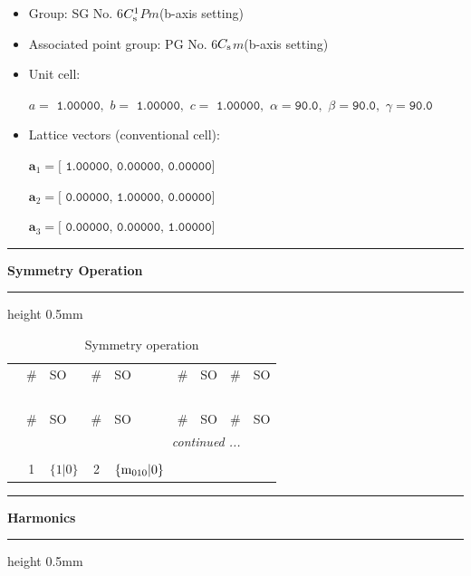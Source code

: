 \documentclass[fleqn,10pt,landscape]{jsarticle}
\begin{document}
\begin{itemize}
\item Group: SG No. 6\quad$C_{\rm s}^{1}$\quad$Pm$\quad(b-axis setting)\quad[ monoclinic ]
\item Associated point group: PG No. 6\quad$C_{\rm s}$\quad$m$\quad(b-axis setting)\quad[ monoclinic ]
\end{itemize}
\begin{itemize}
\item Unit cell:

\quad $a=\texttt{ 1.00000},\,\, b=\texttt{ 1.00000},\,\, c=\texttt{ 1.00000},\,\, \alpha=\texttt{90.0},\,\, \beta=\texttt{90.0},\,\, \gamma=\texttt{90.0}$

\item Lattice vectors (conventional cell):

\quad $\bm{a}_1=\texttt{[ 1.00000, 0.00000, 0.00000]}$

\quad $\bm{a}_2=\texttt{[ 0.00000, 1.00000, 0.00000]}$

\quad $\bm{a}_3=\texttt{[ 0.00000, 0.00000, 1.00000]}$

\end{itemize}
\vspace{5mm}
\noindent \rule[0.5mm]{5mm}{0.5mm}\hspace{3mm}\textbf{Symmetry Operation}\hspace{3mm}\leaders\hrule height 0.5mm\hfill\kern0pt
\vspace{3mm}

\renewcommand{\arraystretch}{1.6}
\begin{longtable}[l]{c|cl|cl|cl|cl}
\captionsetup{justification=raggedright, singlelinecheck=off}
\caption{Symmetry operation}
 \\
 \hline \hline
 & \# & SO & \# & SO & \# & SO & \# & SO \\ \hline \endfirsthead

\multicolumn{8}{l}{\tablename\ \thetable{}} \\
 \hline \hline
 & \# & SO & \# & SO & \# & SO & \# & SO \\ \hline \endhead

 \hline \hline
\multicolumn{8}{r}{\footnotesize\it continued ...} \\ \endfoot

 \hline \hline
\multicolumn{8}{r}{} \\ \endlastfoot

 & 1 & $\{1|0\}$ & 2 & $\{{\rm m}_{010}|0\}$ \\
\end{longtable}
\vspace{5mm}
\noindent \rule[0.5mm]{5mm}{0.5mm}\hspace{3mm}\textbf{Harmonics}\hspace{3mm}\leaders\hrule height 0.5mm\hfill\kern0pt
\vspace{3mm}
\end{document}
